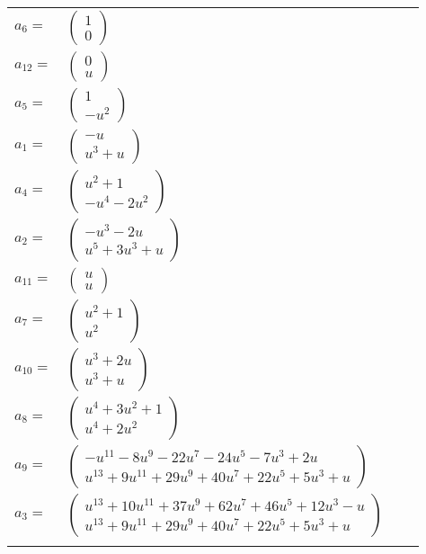 \documentclass[1p]{elsarticle_modified}
\theoremstyle{definition}
\begin{document}
\begin{tabular}{m{7pt} m{180pt} m{7pt} m{180pt} }
\flushright $a_{6}=$&$\begin{pmatrix}1\\0\end{pmatrix}$ \\
\flushright $a_{12}=$&$\begin{pmatrix}0\\u\end{pmatrix}$ \\
\flushright $a_{5}=$&$\begin{pmatrix}1\\- u^2\end{pmatrix}$ \\
\flushright $a_{1}=$&$\begin{pmatrix}- u\\u^3+u\end{pmatrix}$ \\
\flushright $a_{4}=$&$\begin{pmatrix}u^2+1\\- u^4-2 u^2\end{pmatrix}$ \\
\flushright $a_{2}=$&$\begin{pmatrix}- u^3-2 u\\u^5+3 u^3+u\end{pmatrix}$ \\
\flushright $a_{11}=$&$\begin{pmatrix}u\\u\end{pmatrix}$ \\
\flushright $a_{7}=$&$\begin{pmatrix}u^2+1\\u^2\end{pmatrix}$ \\
\flushright $a_{10}=$&$\begin{pmatrix}u^3+2 u\\u^3+u\end{pmatrix}$ \\
\flushright $a_{8}=$&$\begin{pmatrix}u^4+3 u^2+1\\u^4+2 u^2\end{pmatrix}$ \\
\flushright $a_{9}=$&$\begin{pmatrix}- u^{11}-8 u^9-22 u^7-24 u^5-7 u^3+2 u\\u^{13}+9 u^{11}+29 u^9+40 u^7+22 u^5+5 u^3+u\end{pmatrix}$ \\
\flushright $a_{3}=$&$\begin{pmatrix}u^{13}+10 u^{11}+37 u^9+62 u^7+46 u^5+12 u^3- u\\u^{13}+9 u^{11}+29 u^9+40 u^7+22 u^5+5 u^3+u\end{pmatrix}$\\&\end{tabular}
\end{document}
